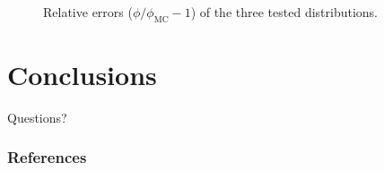 \documentclass[draft]{beamer}
\begin{document}
\begin{frame}
\begin{figure}[tb]
  \centering
  \hspace{-.5in}
  
  \hspace{-.5in}
  \caption{Relative errors ($\phi/\phi_\text{MC} - 1$) of the three tested
  distributions.}
  \label{fig:relative}
\end{figure}
\end{frame}
\section{Conclusions}
\appendix
\begin{frame}{}
{\par\raggedleft Questions?
\par}%
\end{frame}

\begin{frame}
  \frametitle{References}


\end{frame}
\end{document}
